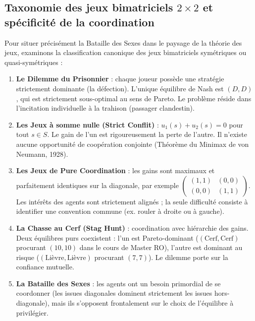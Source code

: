 \documentclass[11pt,a4paper]{article}
\begin{document}
\subsection{Taxonomie des jeux bimatriciels \texorpdfstring{$2 \times 2$}{2x2} et spécificité de la coordination}
Pour situer précisément la Bataille des Sexes dans le paysage de la théorie des jeux, examinons la classification canonique des jeux bimatriciels symétriques ou quasi-symétriques :

\begin{enumerate}[label=(\alph*),leftmargin=1.5em]
    \item \textbf{Le Dilemme du Prisonnier} : chaque joueur possède une stratégie strictement dominante (la défection). L'unique équilibre de Nash est $(D, D)$, qui est strictement sous-optimal au sens de Pareto. Le problème réside dans l'incitation individuelle à la trahison (passager clandestin).
    \item \textbf{Les Jeux à somme nulle (Strict Conflit)} : $u_1(s) + u_2(s) = 0$ pour tout $s \in S$. Le gain de l'un est rigoureusement la perte de l'autre. Il n'existe aucune opportunité de coopération conjointe (Théorème du Minimax de von Neumann, 1928).
    \item \textbf{Les Jeux de Pure Coordination} : les gains sont maximaux et parfaitement identiques sur la diagonale, par exemple $\begin{pmatrix} (1,1) & (0,0) \\ (0,0) & (1,1) \end{pmatrix}$. Les intérêts des agents sont strictement alignés ; la seule difficulté consiste à identifier une convention commune (ex. rouler à droite ou à gauche).
    \item \textbf{La Chasse au Cerf (Stag Hunt)} : coordination avec hiérarchie des gains. Deux équilibres purs coexistent : l'un est Pareto-dominant ($(\text{Cerf}, \text{Cerf})$ procurant $(10, 10)$ dans le cours de Master RO), l'autre est dominant au risque ($(\text{Lièvre}, \text{Lièvre})$ procurant $(7, 7)$). Le dilemme porte sur la confiance mutuelle.
    \item \textbf{La Bataille des Sexes} : les agents ont un besoin primordial de se coordonner (les issues diagonales dominent strictement les issues hors-diagonale), mais ils s'opposent frontalement sur le choix de l'équilibre à privilégier.
\end{enumerate}
\end{document}
